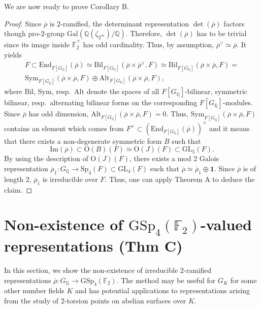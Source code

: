 \documentclass{amsart}
\theoremstyle{definition}
\newcommand{\lra}{\longrightarrow}
\newcommand{\Q}{\mathbb{Q}}
\newcommand{\F}{\mathbb{F}}
\newcommand{\bF}{\overline{\F}}
\newcommand{\br}{\overline{\rho}}
\newcommand{\GSp}{\mathrm{GSp}}
\newcommand{\Sp}{\mathrm{Sp}}
\newcommand{\GL}{\mathrm{GL}}
\newcommand{\OO}{\mathrm{O}}
\newcommand{\Sym}{\mathrm{Sym}}
\newcommand{\Gal}{\mathrm{Gal}}
\newcommand{\im}{\mathrm{Im}}
\newcommand{\End}{\mathrm{End}}
\newcommand{\Bil}{\mathrm{Bil}}
\newcommand{\Alt}{\mathrm{Alt}}
\begin{document}
We are now ready to prove Corollary B.
\begin{proof}
  Since $\br$ is $2$-ramified, the determinant representation
  $\det(\br)$ factors though pro-$2$-group $\Gal(\Q(\zeta_{2^\infty})/\Q)$.
  Therefore, $\det(\br)$ has to be trivial since its image inside $\bF^\times_2$ has odd cardinality.
  Thus, by assumption, $\br^\vee\simeq \br$.
  It yields
  \begin{multline*}
    F\subset \End_{F[G_\Q]}(\br)\simeq \Bil_{F[G_\Q]}(\br\times \br^\vee,F)
    \simeq
    \Bil_{F[G_\Q]}(\br\times \br,F)= \\
    \Sym_{F[G_\Q]}(\br\times \br,F)\oplus
    \Alt_{F[G_\Q]}(\br\times \br,F),
  \end{multline*}
  where $\Bil$, $\Sym$, resp.\ $\Alt$ denote the spaces of all $F[G_\Q]$-bilinear, symmetric bilinear, resp.\ alternating bilinear forms on the corresponding $F[G_\Q]$-modules.
  Since $\br$ has odd dimension, $\Alt_{F[G_\Q]}(\br\times \br,F)=0$.
  Thus, $\Sym_{F[G_\Q]}(\br\times \br,F)$ contains an element
  which comes from $F^\times \subset (\End_{F[G_\Q]}(\br))^\times$
  and
  it means that there exists a non-degenerate symmetric form $B$ such that
  \begin{equation*}
    \im(\br)\subset \OO(B)(F)\simeq \OO(J)(F)\subset \GL_5(F).
  \end{equation*}
  By using the description of $\OO(J)(F)$, there exists
  a mod 2 Galois representation $\br_1:G_\Q\lra \Sp_4(F)\subset \GL_4(F)$ such that
  $\br\simeq \br_1\oplus \mathbf{1}$.
  Since $\br$ is of length 2, $\br_1$ is irreducible over $F$. Thus, one can apply Theorem A to deduce the claim.
\end{proof}


\section{Non-existence of \texorpdfstring{$\GSp_4(\F_2)$}{GSp4F2}-valued representations (Thm C)}\label{GSp4tri}
In this section, we show the non-existence of irreducible $2$-ramified representations $\br:G_\Q\lra \GSp_4(\F_2)$.
The method may be useful for $G_K$ for some other number fields $K$ and has potential
applications to representations arising from the study of $2$-torsion points on abelian surfaces over $K$.
\end{document}
